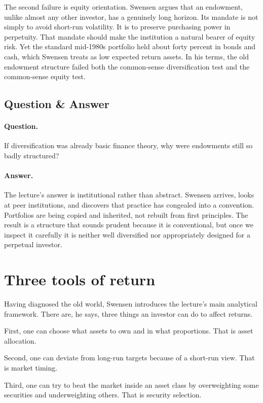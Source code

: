 The second failure is equity orientation. Swensen argues that an endowment, unlike almost any other investor, has a genuinely long horizon. Its mandate is not simply to avoid short-run volatility. It is to preserve purchasing power in perpetuity. That mandate should make the institution a natural bearer of equity risk. Yet the standard mid-1980s portfolio held about forty percent in bonds and cash, which Swensen treats as low expected return assets. In his terms, the old endowment structure failed both the common-sense diversification test and the common-sense equity test.

\subsection{Question \& Answer}

\paragraph{Question.} If diversification was already basic finance theory, why were endowments still so badly structured?

\paragraph{Answer.} The lecture's answer is institutional rather than abstract. Swensen arrives, looks at peer institutions, and discovers that practice has congealed into a convention. Portfolios are being copied and inherited, not rebuilt from first principles. The result is a structure that sounds prudent because it is conventional, but once we inspect it carefully it is neither well diversified nor appropriately designed for a perpetual investor.

\section{Three tools of return}

Having diagnosed the old world, Swensen introduces the lecture's main analytical framework. There are, he says, three things an investor can do to affect returns.

First, one can choose what assets to own and in what proportions. That is asset allocation.

Second, one can deviate from long-run targets because of a short-run view. That is market timing.

Third, one can try to beat the market inside an asset class by overweighting some securities and underweighting others. That is security selection.

